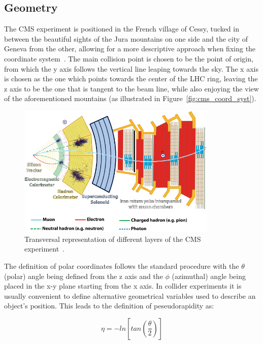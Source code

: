 \subsection{Geometry}
\label{sec:geometry}
\hspace{10pt} The CMS experiment is positioned in the French village of Cessy, tucked in between the beautiful sights of the Jura mountains on one side and the city of Geneva from the other, allowing for a more descriptive approach when fixing the coordinate system~\cite{cms:tdr}. The main collision point is chosen to be the point of origin, from which the y axis follows the vertical line leaping towards the sky. The x axis is chosen as the one which points towards the center of the LHC ring, leaving the z axis to be the one that is tangent to the beam line, while also enjoying the view of the aforementioned mountains (as illustrated in Figure~\ref{fig:cms_coord_syst}).
\begin{figure}[htbp]
  \centering
    \includegraphics[width=0.85\textwidth]{CMS_experiment/CMSslice_whiteBackground.png}
  \caption[Transversal representation of different layers of the CMS experiment.]{Transversal representation of different layers of the CMS experiment~\cite{zCMS_slice}.}
  \label{fig:cms_slice}
\end{figure}
The definition of polar coordinates follows the standard procedure with the $\theta$ (polar) angle being defined from the z axis and the $\phi$ (azimuthal) angle being placed in the x-y plane starting from the x axis. In collider experiments it is usually convenient to define alternative geometrical variables used to describe an object's position. This leads to the definition of peseudorapidity as: 

\begin{equation}
\eta = -ln\left [tan\left (\frac{\theta}{2}\right ) \right]
\end{equation}

